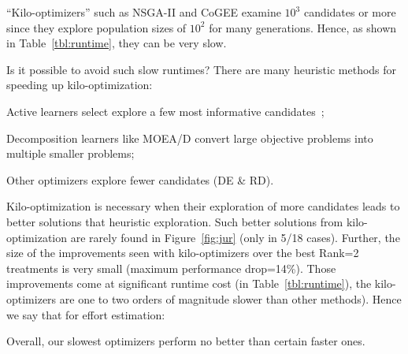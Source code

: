``Kilo-optimizers'' such as  NSGA-II and CoGEE examine $10^3$ candidates or more
since  they explore population sizes
of $10^2$ for many generations. Hence, as shown in Table~\ref{tbl:runtime},
they can be very slow.

Is it possible to avoid such slow runtimes?
There are many heuristic methods for speeding up
kilo-optimization:
\bi
\item Active learners  select explore a few most informative candidates~\cite{krall15};
\item Decomposition learners like MOEA/D  convert large
objective problems into multiple smaller problems;
\item
Other optimizers   explore   fewer candidates (DE \& RD).
\ei

Kilo-optimization is necessary when their exploration of  more candidates leads to better solutions that heuristic exploration.
Such better solutions from kilo-optimization are rarely found in Figure~\ref{fig:jur} (only in 5/18 cases). Further, the size of the improvements
seen with kilo-optimizers   over the best Rank=2 treatments is very small (maximum performance drop=14\%).
Those improvements come at significant runtime cost (in Table~\ref{tbl:runtime}), the kilo-optimizers
are one to two orders of magnitude slower than other methods). Hence we say that for effort estimation:

\begin{result}{3}
Overall,  our  slowest  optimizers  perform  no
better than certain faster ones.
 \end{result}
 
